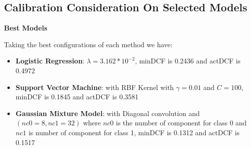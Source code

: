 
\subsection{Calibration Consideration On Selected Models}
\label{subsec:bestModels}
\textbf{Best Models}

Taking the best configurations of each method we have:
\begin{itemize}
    \item \textbf{Logistic Regression}: \(\lambda=3.162*10^{-2}\), minDCF is 0.2436 and actDCF is 0.4972
    \item \textbf{Support Vector Machine}: with RBF Kernel with \(\gamma=0.01\) and \(C=100\), minDCF is 0.1845 and actDCF is 0.3581
    \item \textbf{Gaussian Mixture Model}: with Diagonal convolution and \((nc0=8, nc1=32)\) where \(nc0\) is the number of
    component for class 0 and \(nc1\) is number of component for class 1, minDCF is 0.1312 and actDCF is 0.1517
\end{itemize}
